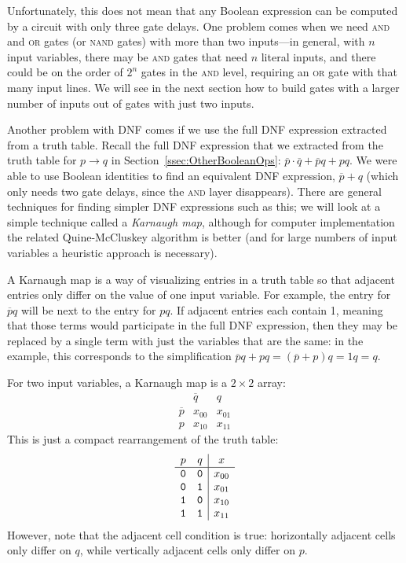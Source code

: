 Unfortunately, this does not mean that any Boolean expression can be computed by a circuit with only three gate delays. One problem comes when we need \textsc{and} and \textsc{or} gates (or \textsc{nand} gates) with more than two inputs---in general, with $n$ input variables, there may be \textsc{and} gates that need $n$ literal inputs, and there could be on the order of $2^n$ gates in the \textsc{and} level, requiring an \textsc{or} gate with that many input lines. We will see in the next section how to build gates with a larger number of inputs out of gates with just two inputs.

Another problem with DNF comes if we use the full DNF expression extracted from a truth table. Recall the full DNF expression that we extracted from the truth table for $p\rightarrow q$ in Section~\ref{ssec:OtherBooleanOps}: $\overline{p}\cdot\overline{q}+\overline{p}q+pq$. We were able to use Boolean identities to find an equivalent DNF expression, $\overline{p}+q$ (which only needs two gate delays, since the \textsc{and} layer disappears). There are general techniques for finding simpler DNF expressions such as this; we will look at a simple technique called a \textit{Karnaugh map}, although for computer implementation the related Quine-McCluskey algorithm is better (and for large numbers of input variables a heuristic approach is necessary).

A Karnaugh map is a way of visualizing entries in a truth table so that adjacent entries only differ on the value of one input variable. For example, the entry for $\overline{p}q$ will be next to the entry for $pq$. If adjacent entries each contain 1, meaning that those terms would participate in the full DNF expression, then they may be replaced by a single term with just the variables that are the same: in the example, this corresponds to the simplification $\overline{p}q + pq=(\overline{p}+p)q=1q=q$.

For two input variables, a Karnaugh map is a $2\times 2$ array:
\[ \begin{array}{r|cc}
& \overline{q} & q\\ \hline
\overline{p} & x_{00} & x_{01}\\
p & x_{10} & x_{11}
\end{array} \]
This is just a compact rearrangement of the truth table:
\[ \begin{array}{cc|c}
p & q & x\\ \hline
\mathtt{0} & \mathtt{0} & x_{00}\\
\mathtt{0} & \mathtt{1} & x_{01}\\
\mathtt{1} & \mathtt{0} & x_{10}\\
\mathtt{1} & \mathtt{1} & x_{11}
\end{array} \]
However, note that the adjacent cell condition is true: horizontally adjacent cells only differ on $q$, while vertically adjacent cells only differ on $p$.

